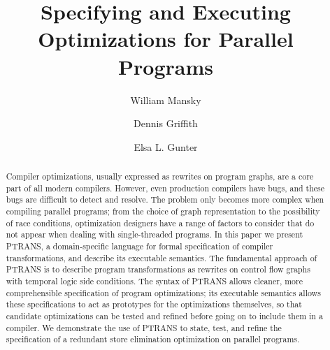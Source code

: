 \documentclass{eptcs}
\newcommand{\ptrans}[0]{PTRANS}
\begin{document}
\title{Specifying and Executing Optimizations for Parallel Programs}
\author{William Mansky \and Dennis Griffith \and Elsa L. Gunter
\email{\mails}}
\maketitle

\begin{abstract}
Compiler optimizations, usually expressed as rewrites on program graphs, are a core part of all modern compilers. However, even production compilers have bugs, and these bugs are difficult to detect and resolve. The problem only becomes more complex when compiling parallel programs; from the choice of graph representation to the possibility of race conditions, optimization designers have a range of factors to consider that do not appear when dealing with single-threaded programs. In this paper we present {\ptrans}, a domain-specific language for formal specification of compiler transformations, and describe its executable semantics. The fundamental approach of {\ptrans} is to describe program transformations as rewrites on control flow graphs with temporal logic side conditions. The syntax of {\ptrans} allows cleaner, more comprehensible specification of program optimizations; its executable semantics allows these specifications to act as prototypes for the optimizations themselves, so that candidate optimizations can be tested and refined before going on to include them in a compiler. We demonstrate the use of {\ptrans} to state, test, and refine the specification of a redundant store elimination optimization on parallel programs.

\end{abstract}
\end{document}
